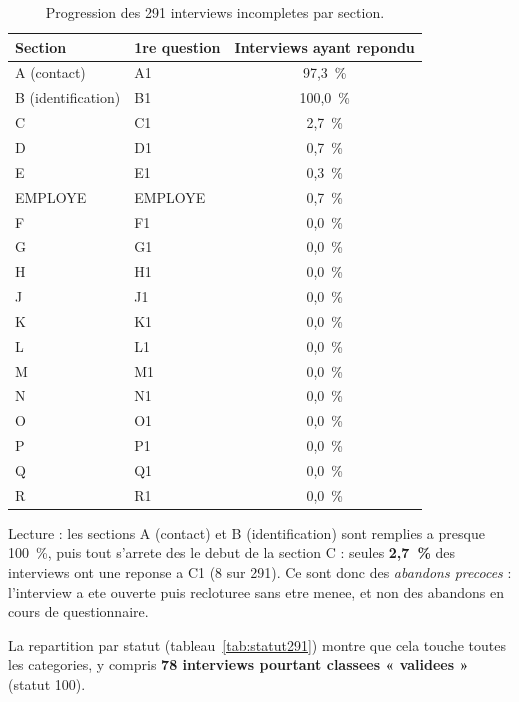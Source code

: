 \documentclass[11pt,a4paper]{article}
\begin{document}
\begin{table}[h]
\centering
\caption{Progression des 291 interviews incompletes par section.}
\label{tab:prog291}
\small
\begin{tabular}{L{3.4cm}L{3.4cm}c}
\toprule
\textbf{Section} & \textbf{1re question} & \textbf{Interviews ayant repondu} \\
\midrule
A (contact)          & A1   & 97,3~\% \\
B (identification)   & B1   & 100,0~\% \\
C                    & C1   & 2,7~\%  \\
D                    & D1   & 0,7~\%  \\
E                    & E1   & 0,3~\%  \\
EMPLOYE              & EMPLOYE & 0,7~\% \\
F                    & F1   & 0,0~\%  \\
G                    & G1   & 0,0~\%  \\
H                    & H1   & 0,0~\%  \\
J                    & J1   & 0,0~\%  \\
K                    & K1   & 0,0~\%  \\
L                    & L1   & 0,0~\%  \\
M                    & M1   & 0,0~\%  \\
N                    & N1   & 0,0~\%  \\
O                    & O1   & 0,0~\%  \\
P                    & P1   & 0,0~\%  \\
Q                    & Q1   & 0,0~\%  \\
R                    & R1   & 0,0~\%  \\
\bottomrule
\end{tabular}
\end{table}

\noindent Lecture : les sections A (contact) et B (identification) sont
remplies a presque 100~\%, puis tout s'arrete des le debut de la section
C : seules \textbf{2,7~\%} des interviews ont une reponse a C1 (8 sur 291).
Ce sont donc des \emph{abandons precoces} : l'interview a ete ouverte puis
recloturee sans etre menee, et non des abandons en cours de questionnaire.

La repartition par statut (tableau~\ref{tab:statut291}) montre que cela
touche toutes les categories, y compris \textbf{78 interviews pourtant
classees « validees »} (statut 100).
\end{document}
